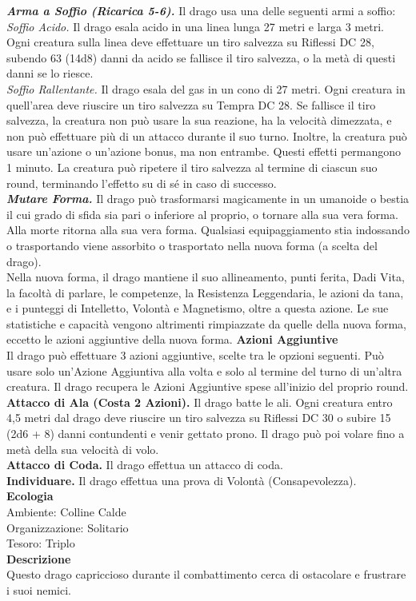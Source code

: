 \begin{multicols}{2}
\emph{\textbf{Arma a Soffio (Ricarica 5-6).}} Il drago usa una delle seguenti armi a soffio:\\
\emph{Soffio Acido.} Il drago esala acido in una linea lunga 27 metri e larga 3 metri. Ogni creatura sulla linea deve effettuare un tiro salvezza su Riflessi DC  28, subendo 63 (14d8) danni da acido se fallisce il tiro salvezza, o la metà di questi danni se lo riesce.\\
\emph{Soffio Rallentante.} Il drago esala del gas in un cono di 27 metri. Ogni creatura in quell'area deve riuscire un tiro salvezza su Tempra DC  28. Se fallisce il tiro salvezza, la creatura non può usare la sua reazione, ha la velocità dimezzata, e non può effettuare più di un attacco durante il suo turno. Inoltre, la creatura può usare un'azione o un'azione bonus, ma non entrambe. Questi effetti permangono 1 minuto. La creatura può ripetere il tiro salvezza al termine di ciascun suo round, terminando l'effetto su di sé in caso di successo.\\
\emph{\textbf{Mutare Forma.}} Il drago può trasformarsi magicamente in un umanoide o bestia il cui grado di sfida sia pari o inferiore al proprio, o tornare alla sua vera forma. Alla morte ritorna alla sua vera forma. Qualsiasi equipaggiamento stia indossando o trasportando viene assorbito o trasportato nella nuova forma (a scelta del drago). \\
Nella nuova forma, il drago mantiene il suo allineamento, punti ferita, Dadi Vita, la facoltà di parlare, le competenze, la Resistenza Leggendaria, le azioni da tana, e i punteggi di Intelletto, Volontà e Magnetismo, oltre a questa azione. Le sue statistiche e capacità  vengono altrimenti rimpiazzate da quelle della nuova forma, eccetto le azioni aggiuntive della nuova forma.
\textbf{Azioni Aggiuntive}\\
Il drago può effettuare 3 azioni aggiuntive, scelte tra le opzioni seguenti. Può usare solo un'Azione Aggiuntiva alla volta e solo al termine del turno di un'altra creatura. Il drago recupera le Azioni Aggiuntive spese all'inizio del proprio round.\\
\textbf{Attacco di Ala (Costa 2 Azioni).} Il drago batte le ali. Ogni creatura entro 4,5 metri dal drago deve riuscire un tiro salvezza su Riflessi DC  30 o subire 15 (2d6 + 8) danni contundenti e venir gettato prono. Il drago può poi volare fino a metà della sua velocità di volo.\\
\textbf{Attacco di Coda.} Il drago effettua un attacco di coda.\\
\textbf{Individuare.} Il drago effettua una prova di Volontà (Consapevolezza).\\
\textbf{Ecologia}\\
Ambiente: Colline Calde\\
Organizzazione: Solitario\\
Tesoro: Triplo\\
\textbf{Descrizione}\\
Questo drago capriccioso durante il combattimento cerca di ostacolare e frustrare i suoi nemici.\\


\end{multicols}
